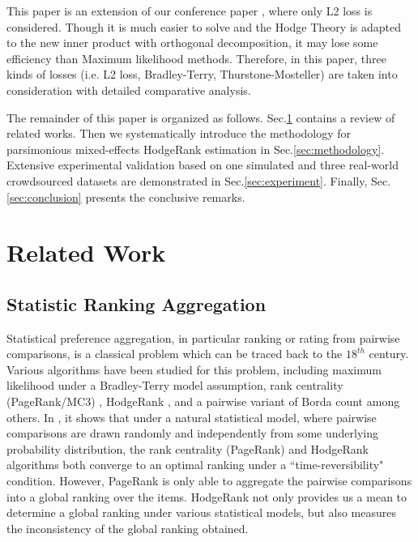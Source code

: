 \documentclass[10pt,journal,cspaper,compsoc]{IEEEtran}
\begin{document}
This paper is an extension of our conference paper
\cite{mm16}, where only L2 loss is considered. Though it is much easier to solve and the Hodge Theory is adapted to the new inner product with orthogonal decomposition, it may lose some efficiency than Maximum likelihood methods. Therefore, in this paper, three kinds of losses (i.e. L2 loss, Bradley-Terry, Thurstone-Mosteller) are taken into consideration with detailed comparative analysis.

The remainder of this paper is organized as follows. Sec.\ref{sec:relatedwork} contains a review of related works. Then we systematically introduce the methodology for parsimonious mixed-effects HodgeRank estimation in Sec.\ref{sec:methodology}. Extensive experimental validation based on one simulated and three real-world crowdsourced datasets are demonstrated in Sec.\ref{sec:experiment}. Finally, Sec.\ref{sec:conclusion} presents the conclusive remarks.


\section{Related Work} \label{sec:relatedwork}

\subsection{Statistic Ranking Aggregation}

Statistical preference aggregation, in particular ranking or rating from pairwise comparisons,
is a classical problem which can be traced back to the $18^{th}$ century.
Various algorithms have been studied for this problem, including maximum
likelihood under a Bradley-Terry model
assumption, rank centrality (PageRank/MC3) \cite{negahban2012,dwork2001rank}, HodgeRank \cite{Hodge}
, and a pairwise variant of Borda
count \cite{de1781memoire} among others. In \cite{ICML14}, it shows that under a natural statistical model, where pairwise comparisons
are drawn randomly and independently from some
underlying probability distribution, the rank centrality (PageRank) and
HodgeRank algorithms both converge to an optimal ranking under
a ``time-reversibility" condition. However, PageRank is only able to aggregate the pairwise comparisons
into a global ranking over the items. HodgeRank not only provides us a mean to determine a global ranking under
various statistical models, but also measures the inconsistency of the global ranking obtained.
\end{document}
